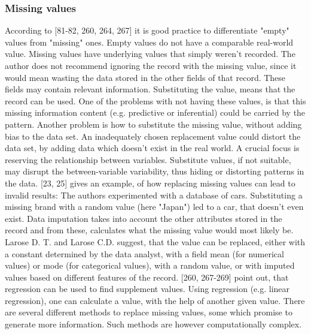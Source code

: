 \subsubsection{Missing values}
According to \textcite{dataPreparationForDataMining}[81-82, 260, 264, 267] it is good practice to differentiate "empty" values from "missing" ones. Empty values do not have a comparable real-world value. Missing values have underlying values that simply weren't recorded. The author does not recommend ignoring the record with the missing value, since it would mean wasting the data stored in the other fields of that record. These fields may contain relevant information. Substituting the value, means that the record can be used. One of the problems with not having these values, is that this missing information content (e.g. predictive or inferential) could be carried by the pattern. Another problem is how to substitute the missing value, without adding bias to the data set. An inadequately chosen replacement value could distort the data set, by adding data which doesn't exist in the real world. A crucial focus is reserving the relationship between variables.  Substitute values, if not suitable, may disrupt the between-variable variability, thus hiding or distorting patterns in the data. 
\textcite{DataMiningAndPredictiveAnalytics}[23, 25] gives an example, of how replacing missing values can lead to invalid results: The authors experimented with a database of cars. Substituting a missing brand with a random value (here "Japan") led to a car, that doesn't even exist. Data imputation takes into account the other attributes stored in the record and from these, calculates what the missing value would most likely be. Larose D. T. and Larose C.D. suggest, that the value can be replaced, either with a constant determined by the data analyst, with a field mean (for numerical values) or mode (for categorical values), with a random value, or with imputed values based on different features of the record.  
\textcite{dataPreparationForDataMining}[260, 267-269] point out, that regression can be used to find supplement values. Using regression (e.g. linear regression), one can calculate a value, with the help of another given value. There are several different methods to replace missing values, some which promise to generate more information. Such methods are however computationally complex.  



